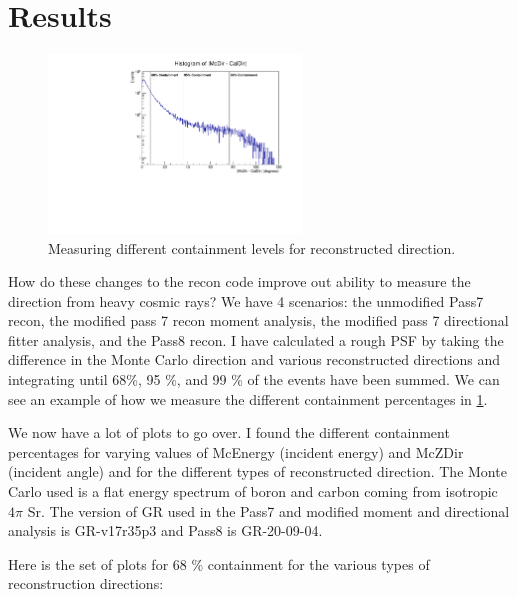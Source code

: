\documentclass[11pt]{article}
\begin{document}
\section{Results}

\begin{figure}
  \begin{center}
    \includegraphics[width=0.6\textwidth]{psf}
  \end{center}
  \caption{Measuring different containment levels for reconstructed direction.  }
  \label{psf}
\end{figure}

How do these changes to the recon code improve out ability to measure the direction from heavy cosmic rays?  We have 4 scenarios:  the unmodified Pass7 recon, the modified pass 7 recon moment analysis, the modified pass 7 directional fitter analysis, and the Pass8 recon.  
I have calculated a rough PSF by taking the difference in the Monte Carlo direction and various reconstructed directions and integrating until 68\%, 95 \%, and 99 \% of the events have been summed.  We can see an example of how we measure the different containment percentages in \ref{psf}.

We now have a lot of plots to go over.  I found the different containment percentages for varying values of McEnergy (incident energy) and McZDir (incident angle) and for the different types of reconstructed direction.  The Monte Carlo used is a flat energy spectrum of boron and carbon coming from isotropic $4\pi$ Sr.  The version of GR used in the Pass7 and modified moment and directional analysis is GR-v17r35p3 and Pass8 is GR-20-09-04.


\newpage

Here is the set of plots for 68 \% containment for the various types of reconstruction directions:
\end{document}
